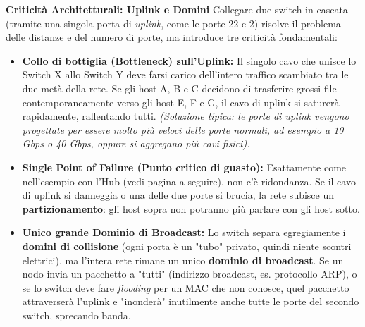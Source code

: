 \documentclass[a4paper,12pt]{report}
\begin{document}
\begin{notebox}{\textbf{Criticità Architetturali: Uplink e Domini}}
Collegare due switch in cascata (tramite una singola porta di \textit{uplink}, come le porte 22 e 2) risolve il problema delle distanze e del numero di porte, ma introduce tre criticità fondamentali:

\begin{itemize}[leftmargin=*]
    \item \textbf{Collo di bottiglia (Bottleneck) sull'Uplink:} 
    Il singolo cavo che unisce lo Switch X allo Switch Y deve farsi carico dell'intero traffico scambiato tra le due metà della rete. Se gli host A, B e C decidono di trasferire grossi file contemporaneamente verso gli host E, F e G, il cavo di uplink si saturerà rapidamente, rallentando tutti. 
    \textit{(Soluzione tipica: le porte di uplink vengono progettate per essere molto più veloci delle porte normali, ad esempio a 10 Gbps o 40 Gbps, oppure si aggregano più cavi fisici).}

    \item \textbf{Single Point of Failure (Punto critico di guasto):} 
    Esattamente come nell'esempio con l'Hub (vedi pagina a seguire), non c'è ridondanza. Se il cavo di uplink si danneggia o una delle due porte si brucia, la rete subisce un \textbf{partizionamento}: gli host sopra non potranno più parlare con gli host sotto.

    \item \textbf{Unico grande Dominio di Broadcast:} 
    Lo switch separa egregiamente i \textbf{domini di collisione} (ogni porta è un "tubo" privato, quindi niente scontri elettrici), ma l'intera rete rimane un unico \textbf{dominio di broadcast}. Se un nodo invia un pacchetto a "tutti" (indirizzo broadcast, es. protocollo ARP), o se lo switch deve fare \textit{flooding} per un MAC che non conosce, quel pacchetto attraverserà l'uplink e "inonderà" inutilmente anche tutte le porte del secondo switch, sprecando banda.
\end{itemize}
\end{notebox}
\end{document}
